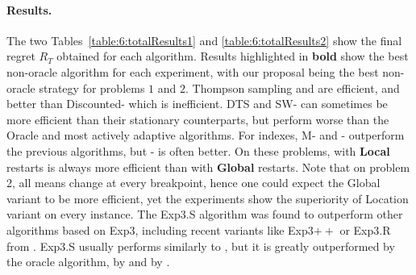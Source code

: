 


\paragraph{Results.}
\label{sub:6:NumericalResults}


The two Tables~\ref{table:6:totalResults1} and \ref{table:6:totalResults2} show the final regret $R_T$ obtained for each algorithm.
Results highlighted in \textbf{bold} show the best non-oracle algorithm for each experiment,
with our proposal being the best non-oracle strategy for problems $1$ and $2$.
Thompson sampling and \klUCB{} are efficient,
and better than Discounted-\klUCB{} which is inefficient.
DTS and SW-\klUCB{} can sometimes be more efficient than their stationary counterparts, but perform worse than the Oracle and most actively adaptive algorithms.
%
For \klUCB{} indexes, M- and \CUSUM- outperform the previous algorithms, but \GLR- is often better.
%
On these problems, \GLRklUCB{} with \textbf{Local} restarts is always more efficient than with \textbf{Global} restarts. Note that on problem 2, all means change at every breakpoint, hence one could expect the Global variant to be more efficient, yet the experiments show the superiority of Location variant on every instance.
The Exp3.S algorithm was found to outperform other algorithms based on Exp3, including recent variants like Exp3$++$ \cite{Seldin17} or Exp3.R from \cite{Allesiardo17}.
Exp3.S usually performs similarly to \MklUCB, but it is greatly outperformed by the oracle algorithm, by \GLRklUCB{} and by \CUSUMklUCB.


